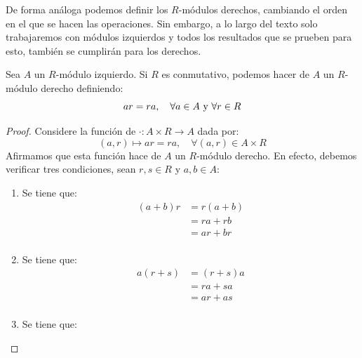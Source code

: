 \documentclass[12pt]{report}
\newcounter{it}
\theoremstyle{largebreak}
\newcommand\cf[3]{\ensuremath{#1:#2\rightarrow#3}}
\begin{document}
    De forma análoga podemos definir los $R$-módulos derechos, cambiando el orden en el que se hacen las operaciones. Sin embargo, a lo largo del texto solo trabajaremos con módulos izquierdos y todos los resultados que se prueben para esto, también se cumplirán para los derechos.
    
    \begin{excer}
        Sea $A$ un $R$-módulo izquierdo. Si $R$ es conmutativo, podemos hacer de $A$ un $R$-módulo derecho definiendo:
        \begin{equation*}
            ar = ra,\quad\forall a\in A\textup{ y }\forall r\in R
        \end{equation*}
    \end{excer}

    \begin{proof}
        Considere la función de $\cf{\cdot}{A\times R}{A}$ dada por:
        \begin{equation*}
            (a,r)\mapsto ar=ra,\quad\forall (a,r)\in A\times R
        \end{equation*}
        Afirmamos que esta función hace de $A$ un $R$-módulo derecho. En efecto, debemos verificar tres condiciones, sean $r,s\in R$ y $a,b\in A$:
        \begin{enumerate}[label=\textit{(\arabic*)}]
            \item Se tiene que:
            \begin{equation*}
                \begin{split}
                    (a+b)r&=r(a+b)\\
                    &=ra+rb\\
                    &=ar+br\\
                \end{split}
            \end{equation*}
            \item Se tiene que:
            \begin{equation*}
                \begin{split}
                    a(r+s)&=(r+s)a\\
                    &=ra+sa\\
                    &=ar+as\\
                \end{split}
            \end{equation*}
            \item Se tiene que:
            \begin{equation*}

\end{equation*}
\end{enumerate}
\end{proof}
\end{document}
